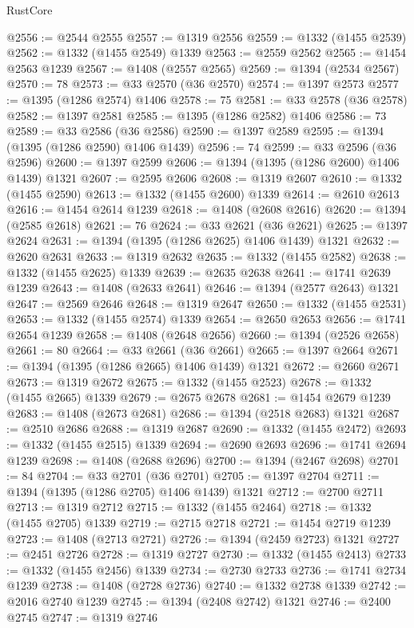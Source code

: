 \begin{lexlean}{RustCore}
\begin{coremodule}
@2556 := @2544 @2555
@2557 := @1319 @2556
@2559 := @1332 (@1455 @2539)
@2562 := @1332 (@1455 @2549) @1339
@2563 := @2559 @2562
@2565 := @1454 @2563 @1239
@2567 := @1408 (@2557 @2565)
@2569 := @1394 (@2534 @2567)
@2570 := 78
@2573 := @33 @2570 (@36 @2570)
@2574 := @1397 @2573
@2577 := @1395 (@1286 @2574) @1406
@2578 := 75
@2581 := @33 @2578 (@36 @2578)
@2582 := @1397 @2581
@2585 := @1395 (@1286 @2582) @1406
@2586 := 73
@2589 := @33 @2586 (@36 @2586)
@2590 := @1397 @2589
@2595 := @1394 (@1395 (@1286 @2590) @1406 @1439)
@2596 := 74
@2599 := @33 @2596 (@36 @2596)
@2600 := @1397 @2599
@2606 := @1394 (@1395 (@1286 @2600) @1406 @1439) @1321
@2607 := @2595 @2606
@2608 := @1319 @2607
@2610 := @1332 (@1455 @2590)
@2613 := @1332 (@1455 @2600) @1339
@2614 := @2610 @2613
@2616 := @1454 @2614 @1239
@2618 := @1408 (@2608 @2616)
@2620 := @1394 (@2585 @2618)
@2621 := 76
@2624 := @33 @2621 (@36 @2621)
@2625 := @1397 @2624
@2631 := @1394 (@1395 (@1286 @2625) @1406 @1439) @1321
@2632 := @2620 @2631
@2633 := @1319 @2632
@2635 := @1332 (@1455 @2582)
@2638 := @1332 (@1455 @2625) @1339
@2639 := @2635 @2638
@2641 := @1741 @2639 @1239
@2643 := @1408 (@2633 @2641)
@2646 := @1394 (@2577 @2643) @1321
@2647 := @2569 @2646
@2648 := @1319 @2647
@2650 := @1332 (@1455 @2531)
@2653 := @1332 (@1455 @2574) @1339
@2654 := @2650 @2653
@2656 := @1741 @2654 @1239
@2658 := @1408 (@2648 @2656)
@2660 := @1394 (@2526 @2658)
@2661 := 80
@2664 := @33 @2661 (@36 @2661)
@2665 := @1397 @2664
@2671 := @1394 (@1395 (@1286 @2665) @1406 @1439) @1321
@2672 := @2660 @2671
@2673 := @1319 @2672
@2675 := @1332 (@1455 @2523)
@2678 := @1332 (@1455 @2665) @1339
@2679 := @2675 @2678
@2681 := @1454 @2679 @1239
@2683 := @1408 (@2673 @2681)
@2686 := @1394 (@2518 @2683) @1321
@2687 := @2510 @2686
@2688 := @1319 @2687
@2690 := @1332 (@1455 @2472)
@2693 := @1332 (@1455 @2515) @1339
@2694 := @2690 @2693
@2696 := @1741 @2694 @1239
@2698 := @1408 (@2688 @2696)
@2700 := @1394 (@2467 @2698)
@2701 := 84
@2704 := @33 @2701 (@36 @2701)
@2705 := @1397 @2704
@2711 := @1394 (@1395 (@1286 @2705) @1406 @1439) @1321
@2712 := @2700 @2711
@2713 := @1319 @2712
@2715 := @1332 (@1455 @2464)
@2718 := @1332 (@1455 @2705) @1339
@2719 := @2715 @2718
@2721 := @1454 @2719 @1239
@2723 := @1408 (@2713 @2721)
@2726 := @1394 (@2459 @2723) @1321
@2727 := @2451 @2726
@2728 := @1319 @2727
@2730 := @1332 (@1455 @2413)
@2733 := @1332 (@1455 @2456) @1339
@2734 := @2730 @2733
@2736 := @1741 @2734 @1239
@2738 := @1408 (@2728 @2736)
@2740 := @1332 @2738 @1339
@2742 := @2016 @2740 @1239
@2745 := @1394 (@2408 @2742) @1321
@2746 := @2400 @2745
@2747 := @1319 @2746

\end{coremodule}
\end{lexlean}
